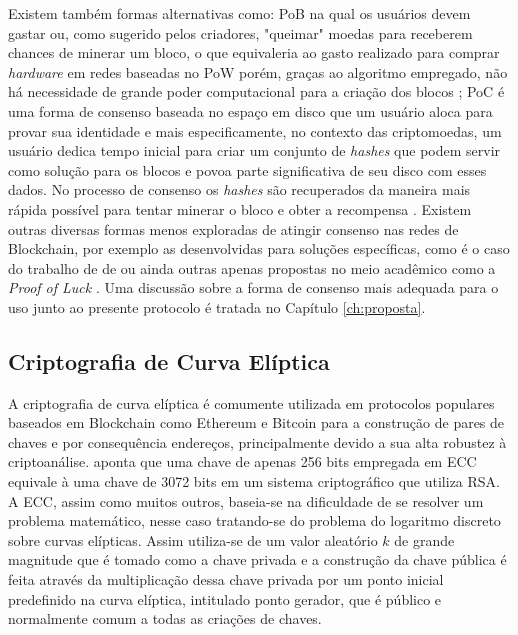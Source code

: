 %
Existem também formas alternativas como: \ac{PoB} na qual os usuários devem gastar ou, como sugerido pelos criadores, "queimar" moedas para receberem chances de minerar um bloco, o que equivaleria ao gasto realizado para comprar \textit{hardware} em redes baseadas no \ac{PoW} porém, graças ao algoritmo empregado, não há necessidade de grande poder computacional para a criação dos blocos \cite{blockchain:PoB}; \ac{PoC} é uma forma de consenso baseada no espaço em disco que um usuário aloca para provar sua identidade \cite{blockchain:origem_PoC} e mais especificamente, no contexto das criptomoedas, um usuário dedica tempo inicial para criar um conjunto de \textit{hashes} que podem servir como solução para os blocos e povoa parte significativa de seu disco com esses dados. No processo de consenso os \textit{hashes} são recuperados da maneira mais rápida possível para tentar minerar o bloco e obter a recompensa \cite{blockchain:burstcoin_PoC}. Existem outras diversas formas menos exploradas de atingir consenso nas redes de Blockchain, por exemplo as desenvolvidas para soluções específicas, como é o caso do trabalho de \citeauthor{blockchain:energia_dc} de \citeyear{blockchain:energia_dc} ou ainda outras apenas propostas no meio acadêmico como a \textit{Proof of Luck} \cite{blockchain:PoL}. Uma discussão sobre a forma de consenso mais adequada para o uso junto ao presente protocolo é tratada no Capítulo \ref{ch:proposta}.

\subsection{Criptografia de Curva Elíptica}
\label{subsec:ecc}

A criptografia de curva elíptica é comumente utilizada em protocolos populares baseados em Blockchain  como Ethereum \cite{blockchain:ethereum} e Bitcoin \cite{blockchain:documentacao_bitcoin} para a construção de pares de chaves e por consequência endereços, principalmente devido a sua alta robustez à criptoanálise.  aponta que uma chave de apenas 256 bits empregada em \ac{ECC} equivale à uma chave de 3072 bits em um sistema criptográfico que utiliza RSA. A \ac{ECC}, assim como muitos outros, baseia-se na dificuldade de se resolver um problema matemático, nesse caso tratando-se do problema do logaritmo discreto sobre curvas elípticas. Assim utiliza-se de um valor aleatório $k$ de grande magnitude que é tomado como a chave privada e a construção da chave pública é feita através da multiplicação dessa chave privada por um ponto inicial predefinido na curva elíptica, intitulado ponto gerador, que é público e normalmente comum a todas as criações de chaves.

